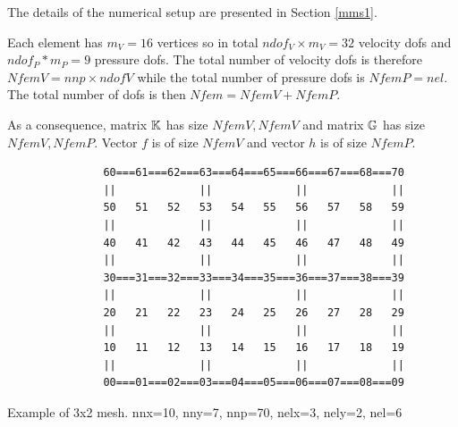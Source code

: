 

The details of the numerical setup are presented in Section \ref{mms1}.

Each element has $m_V=16$ vertices so in total $ndof_V\times m_V=32$ 
velocity dofs and 
$ndof_P*m_P=9$ pressure dofs. The total number of 
velocity dofs is therefore $NfemV=nnp \times ndofV$ while the total number of
pressure dofs is $NfemP=nel$. The total number of dofs is then $Nfem=NfemV+NfemP$.

As a consequence, matrix ${\mathbb{K}}$ has size $NfemV,NfemV$ and matrix ${\mathbb{G}}$ has size $NfemV,NfemP$.
Vector $f$ is of size $NfemV$ and vector $h$ is of size $NfemP$.  

\begin{center}
\begin{verbatim}
               60===61===62===63===64===65===66===67===68===70
               ||             ||             ||             ||
               50   51   52   53   54   55   56   57   58   59
               ||             ||             ||             ||
               40   41   42   43   44   45   46   47   48   49
               ||             ||             ||             ||
               30===31===32===33===34===35===36===37===38===39
               ||             ||             ||             ||
               20   21   22   23   24   25   26   27   28   29
               ||             ||             ||             ||
               10   11   12   13   14   15   16   17   18   19
               ||             ||             ||             ||
               00===01===02===03===04===05===06===07===08===09
\end{verbatim}
{\captionfont Example of 3x2 mesh. nnx=10, nny=7, nnp=70, nelx=3, nely=2, nel=6}
\end{center}


